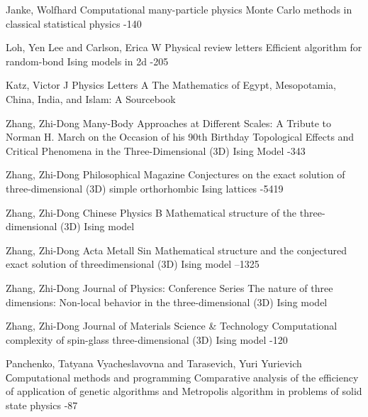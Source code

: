 \documentclass[10pt]{article}
\begin{document}
{\begin{thebibliography}{4}
			\by Janke, Wolfhard
			\jour Computational many-particle physics
			\paper Monte Carlo methods in classical statistical physics
			-140
			
			\by Loh, Yen Lee and Carlson, Erica W
			\jour Physical review letters
			\paper Efficient algorithm for random-bond Ising models in 2d
			-205
			
			\by Katz, Victor J
			\jour Physics Letters A
			\paper The Mathematics of Egypt, Mesopotamia, China, India, and Islam: A Sourcebook
			
			\by Zhang, Zhi-Dong
			\jour Many-Body Approaches at Different Scales: A Tribute to Norman H. March on the Occasion of his 90th Birthday
			\paper Topological Effects and Critical Phenomena in the Three-Dimensional (3D) Ising Model
			-343
			
			\by Zhang, Zhi-Dong
			\jour Philosophical Magazine
			\paper Conjectures on the exact solution of three-dimensional (3D) simple orthorhombic Ising lattices
			-5419
			
			\by Zhang, Zhi-Dong
			\jour Chinese Physics B
			\paper Mathematical structure of the three-dimensional (3D) Ising model
			
			\by Zhang, Zhi-Dong
			\jour Acta Metall Sin
			\paper Mathematical structure and the conjectured exact solution of threedimensional (3D) Ising model
			--1325
			
			\by Zhang, Zhi-Dong
			\jour Journal of Physics: Conference Series
			\paper The nature of three dimensions: Non-local behavior in the three-dimensional (3D) Ising model
			
			\by Zhang, Zhi-Dong
			\jour Journal of Materials Science \& Technology
			\paper Computational complexity of spin-glass three-dimensional (3D) Ising model
			-120
			
			\by Panchenko, Tatyana Vyacheslavovna and Tarasevich, Yuri Yurievich
			\jour Сomputational methods and programming
			\paper Comparative analysis of the efficiency of application of genetic algorithms and Metropolis algorithm in problems of solid state physics
			-87
			
		\end{thebibliography}
	}
	
\end{document}

